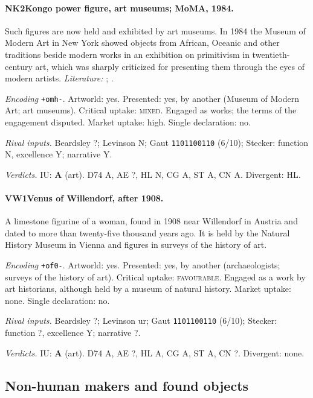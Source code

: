 \paragraph{NK2\enspace Kongo power figure, art museums; MoMA, 1984.}
Such figures are now held and exhibited by art museums. In 1984 the Museum of Modern Art in New York showed objects from African, Oceanic and other traditions beside modern works in an exhibition on primitivism in twentieth-century art, which was sharply criticized for presenting them through the eyes of modern artists. \textit{Literature:} \citet{Rubin1984}; \citet{McEvilley1984}.\par
\noindent\textit{Encoding} \texttt{+omh-}. Artworld: yes. Presented: yes, by another (Museum of Modern Art; art museums). Critical uptake: \textsc{mixed}. Engaged as works; the terms of the engagement disputed. Market uptake: high. Single declaration: no.\par
\noindent\textit{Rival inputs.} Beardsley ?; Levinson N; Gaut \texttt{1101100110} (6/10); Stecker: function N, excellence Y; narrative Y.\par
\noindent\textit{Verdicts.} IU: \textbf{A} (art). D74 A, AE ?, HL N, CG A, ST A, CN A. Divergent: HL.\par

\paragraph{VW1\enspace Venus of Willendorf, after 1908.}
A limestone figurine of a woman, found in 1908 near Willendorf in Austria and dated to more than twenty-five thousand years ago. It is held by the Natural History Museum in Vienna and figures in surveys of the history of art.\par
\noindent\textit{Encoding} \texttt{+of0-}. Artworld: yes. Presented: yes, by another (archaeologists; surveys of the history of art). Critical uptake: \textsc{favourable}. Engaged as a work by art historians, although held by a museum of natural history. Market uptake: none. Single declaration: no.\par
\noindent\textit{Rival inputs.} Beardsley ?; Levinson ur; Gaut \texttt{1101100110} (6/10); Stecker: function ?, excellence Y; narrative ?.\par
\noindent\textit{Verdicts.} IU: \textbf{A} (art). D74 A, AE ?, HL A, CG A, ST A, CN ?. Divergent: none.\par

\subsection{Non-human makers and found objects}

